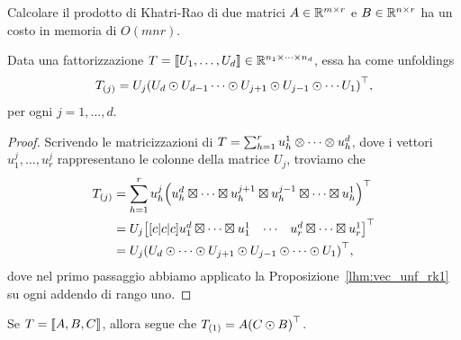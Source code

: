 \begin{remark}
	Calcolare il prodotto di Khatri-Rao di due matrici $ A \in \mathbb{R}^{m \times r} $ e $ B \in \mathbb{R}^{n \times
			r} $ ha un costo in memoria di $ O(mn
		r) $.
\end{remark}

\begin{lemma}
	\label{lhm:krp_unfoldings}
	Data una fattorizzazione $ T = \dsqr{U_1,\ldots, U_d} \in \Rmsiz!$, essa ha come unfoldings
	\[
		\Tm{T}{j} = U_j \left( U_d \krp U_{d-1} \cdots \krp U_{j+1} \krp U_{j-1} \krp \cdots U_1 \right)^{\top}
		,\]  per ogni $ j = 1, \ldots, d $.
\end{lemma}
\begin{proof}
	Scrivendo le matricizzazioni di $ T = \sum_{h=1}^r u_h^1 \otimes \cdots \otimes u_h^d $, dove i vettori $ u_1^j,
		\ldots, u_r^j $ rappresentano le colonne della matrice $ U_j $, troviamo che
	\begin{equation*}
		\begin{aligned}
			\Tm{T}{j} & = \sum_{h=1}^r u_h^j \left( u_h^d \krn \cdots \krn u_h^{j+1} \krn u_h^{j-1} \krn
			\cdots \krn u_h^1 \right)^{\top}                                                                   \\
			          & = U_j \begin{bmatrix}[c|c|c] u_1^d \krn \cdots \krn u_1^1 & \cdots & u_r^d \krn \cdots
               \krn u_r^1\end{bmatrix}^{\top} \\
			          & = U_j \left( U_d \krp \cdots \krp U_{j+1} \krp U_{j-1} \krp \cdots \krp U_1
			\right)^{\top},
		\end{aligned}
	\end{equation*}
	dove nel primo passaggio abbiamo applicato la Proposizione~\ref{lhm:vec_unf_rk1} su ogni addendo di rango uno.
\end{proof}
\begin{example}
	Se $ T = \dsqr{A,B,C} $, allora segue che $ \Tm{T}{1} = A \left( C \krp B \right)^{\top} $.
\end{example}




